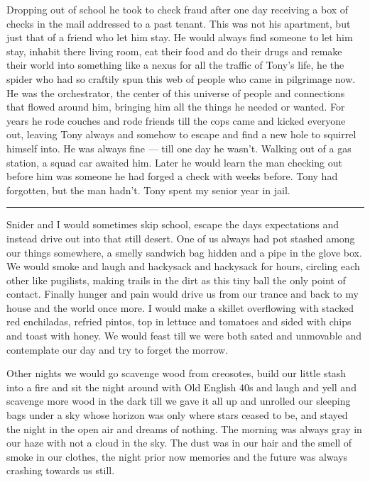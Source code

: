 \documentclass[ebook, 10pt, openright, onecolumn]{memoir}
\newcommand*\td[1]{
  \todo[inline]{
     #1 
  }
}
\newcommand*\starbreak{\fancybreak*{\Large{* * *}}}
\begin{document}
\td{Rework all of this section}

Dropping out of school he took to check fraud after one day receiving a box of
checks in the mail addressed to a past tenant.  This was not his apartment, but
just that of a friend who let him stay. He would always find someone to let him
stay, inhabit there living room, eat their food and do their drugs and remake
their world into something like a nexus for all the traffic of Tony's life, he
the spider who had so craftily spun this web of people who came in pilgrimage
now.  He was the orchestrator, the center of this universe of people and
connections that flowed around him, bringing him all the things he needed or
wanted.  For years he rode couches and rode friends till the cops came and
kicked everyone out, leaving Tony always and somehow to escape and find a new
hole to squirrel himself into.  He was always fine --- till one day he wasn't.
Walking out of a gas station, a squad car awaited him.  Later he would learn
the man checking out before him was someone he had forged a check with weeks
before.  Tony had forgotten, but the man hadn't.  Tony spent my senior year in
jail.

\starbreak

Snider and I would sometimes skip school, escape the days expectations and
instead drive out into that still desert.  One of us always had pot stashed
among our things somewhere, a smelly sandwich bag hidden and a pipe in the glove
box. We would smoke and laugh and hackysack and hackysack for hours, circling
each other like pugilists, making trails in the dirt as this tiny ball the only
point of contact.  Finally hunger and pain would drive us from our trance and
back to my house and the world once more.  I would make a skillet overflowing
with stacked red enchiladas, refried pintos, top in lettuce and tomatoes and
sided with chips and toast with honey.  We would feast till we were both sated
and unmovable and contemplate our day and try to forget the morrow.

Other nights we would go scavenge wood from creosotes, build our little
stash into a fire and sit the night around with Old English 40s and laugh and
yell and scavenge more wood in the dark till we gave it all up and unrolled our
sleeping bags under a sky whose horizon was only where stars ceased to be, and
stayed the night in the open air and dreams of nothing.  The morning was always
gray in our haze with not a cloud in the sky.  The dust was in our hair and the
smell of smoke in our clothes, the night prior now memories and the future was
always crashing towards us still.
\end{document}
